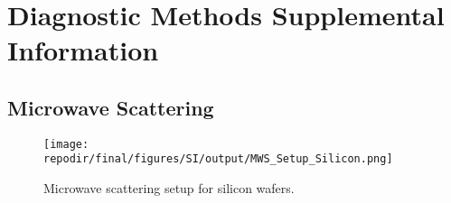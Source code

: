 \section{Diagnostic Methods Supplemental Information}

\subsection{Microwave Scattering}

\begin{figure}[]
\centering
\texttt{[image: \\repodir/final/figures/SI/output/MWS\_Setup\_Silicon.png]}
\caption{Microwave scattering setup for silicon wafers.}
\label{fig:SI_MWS_Setup_Silicon}
\end{figure}
